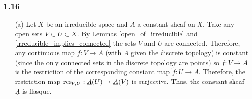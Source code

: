 \documentclass[12pt]{article}
\begin{document}
\subsubsection{1.16}

\begin{enumerate}
\item[(a)] Let $X$ be an irreducible space and $\underline{A}$ a constant sheaf on $X$. Take any open sets $V \subset U \subset X$. By Lemmas \ref{open_of_irreducible} and \ref{irreducible_implies_connected} the sets $V$ and $U$ are connected. Therefore, any continuous map $f : V \to A$ (with $A$ given the discrete topology) is constant (since the only connected sets in the discrete topology are points) so $f : V \to A$ is the restriction of the corresponding constant map $\tilde{f} : U \to A$. Therefore, the restriction map $\mathrm{res}_{V,U} : \underline{A}(U) \to \underline{A}(V)$ is surjective. Thus, the constant sheaf $\underline{A}$ is flasque.  


\end{enumerate}
\end{document}
